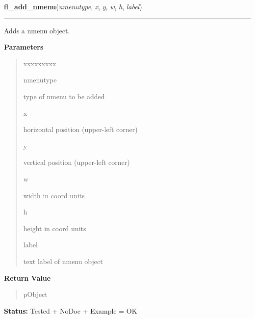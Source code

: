 \hspace{.8\funcindent}\begin{boxedminipage}{\funcwidth}

    \raggedright \textbf{fl\_add\_nmenu}(\textit{nmenutype}, \textit{x}, \textit{y}, \textit{w}, \textit{h}, \textit{label})

    \vspace{-1.5ex}

    \rule{\textwidth}{0.5\fboxrule}
\setlength{\parskip}{2ex}
    Adds a nmenu object.

\setlength{\parskip}{1ex}
      \textbf{Parameters}
      \vspace{-1ex}

      \begin{quote}
        \begin{Ventry}{xxxxxxxxx}

          \item[nmenutype]

          type of nmenu to be added

          \item[x]

          horizontal position (upper-left corner)

          \item[y]

          vertical position (upper-left corner)

          \item[w]

          width in coord units

          \item[h]

          height in coord units

          \item[label]

          text label of nmenu object

        \end{Ventry}

      \end{quote}

      \textbf{Return Value}
    \vspace{-1ex}

      \begin{quote}
      pObject

      \end{quote}

\textbf{Status:} Tested + NoDoc + Example = OK



    \end{boxedminipage}

